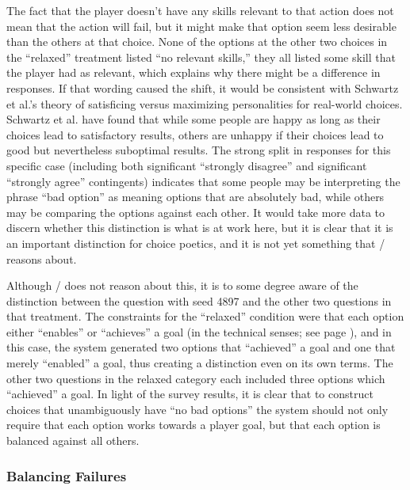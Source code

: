 The fact that the player doesn't have any skills relevant to that action does not mean that the action will fail, but it might make that option seem less desirable than the others at that choice.
%
None of the options at the other two choices in the ``relaxed'' treatment listed ``no relevant skills,'' they all listed some skill that the player had as relevant, which explains why there might be a difference in responses.
%
If that wording caused the shift, it would be consistent with Schwartz et al.'s theory of satisficing versus maximizing personalities \citep{Schwartz2002} for real-world choices.
%
Schwartz et al. have found that while some people are happy as long as their choices lead to satisfactory results, others are unhappy if their choices lead to good but nevertheless suboptimal results.
%
The strong split in responses for this specific case (including both significant ``strongly disagree'' and significant ``strongly agree'' contingents) indicates that some people may be interpreting the phrase ``bad option'' as meaning options that are absolutely bad, while others may be comparing the options against each other.
%
It would take more data to discern whether this distinction is what is at work here, but it is clear that it is an important distinction for choice poetics, and it is not yet something that \dunyazad/ reasons about.


Although \dunyazad/ does not reason about this, it is to some degree aware of the distinction between the question with seed 4897 and the other two questions in that treatment.
%
The constraints for the ``relaxed'' condition were that each option either ``enables'' or ``achieves'' a goal (in the technical senses; see page \pageref{page:choicetypes}), and in this case, the system generated two options that ``achieved'' a goal and one that merely ``enabled'' a goal, thus creating a distinction even on its own terms.
%
The other two questions in the relaxed category each included three options which ``achieved'' a goal.
%
In light of the survey results, it is clear that to construct choices that unambiguously have ``no bad options'' the system should not only require that each option works towards a player goal, but that each option is balanced against all others.


\subsubsection{Balancing Failures}

